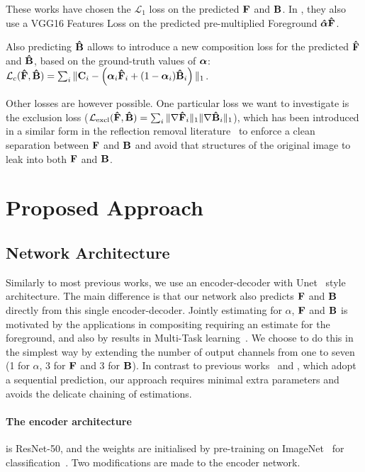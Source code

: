 \documentclass[runningheads]{llncs}
\begin{document}
These works have chosen the $\mathcal{L}_1$ loss on the predicted $\mathbf{{{F}}}$ and $\mathbf{{{B}}}$.  In
\cite{ContextMatting}, they also use a VGG16 Features Loss on the predicted
pre-multiplied Foreground $\bm{\hat{\alpha}} \mathbf{\hat{{F}}}$.

Also predicting $\mathbf{\hat{{B}}}$ allows \cite{LearningBasedSamplingMatting} to introduce a new composition loss for the predicted $\mathbf{\hat{{F}}}$ and $\mathbf{\hat{{B}}}$, based on the
ground-truth values of $\bm{{\alpha}}$: $\mathcal{L}_{c}(\mathbf{\hat{{F}}},\mathbf{\hat{{B}}}) = \sum_i \|\mathbf{C}_i -  \left(\bm{{\alpha}}_i \mathbf{\hat{{F}}}_i +
(1-\bm{{\alpha}}_i) \mathbf{\hat{{B}}}_i\right) \|_1$.


Other losses are however possible. One particular loss we want to investigate is
the exclusion loss ($\mathcal{L}_{\mathrm{excl}}(\mathbf{\hat{{F}}},\mathbf{\hat{{B}}}) = \sum_i \|  \nabla \mathbf{\hat{{F}}}_i \|_1  \| \nabla \mathbf{\hat{{B}}}_i \|_1$), which has been introduced in a similar form in the reflection removal literature~\cite{perceptualReflectionRemoval}
to enforce a clean separation between $\mathbf{{{F}}}$ and $\mathbf{{{B}}}$ and avoid that structures of
the original image to leak into both $\mathbf{{{F}}}$ and $\mathbf{{{B}}}$.



\section{Proposed Approach}\label{sec:method}




\subsection{Network Architecture}

Similarly to most previous works, we use an encoder-decoder with
Unet~\cite{unet} style architecture. The main difference is that our network
also predicts $\mathbf{{{F}}}$ and $\mathbf{{{B}}}$ directly from this single encoder-decoder. Jointly
estimating for $\alpha$, $\mathbf{{{F}}}$ and $\mathbf{{{B}}}$ is motivated by the applications in
compositing requiring an estimate for the foreground, and also by results in
Multi-Task learning~\cite{ruder2017overview}. We choose to do this in the simplest way by
extending the number of output channels from one to seven (1 for $\alpha$, 3 for
$\mathbf{{{F}}}$ and 3 for $\mathbf{{{B}}}$). In contrast to previous works~\cite{ContextMatting} and
\cite{LearningBasedSamplingMatting}, which adopt a sequential prediction, our
approach requires minimal extra parameters and avoids the delicate chaining of
estimations.


\paragraph{The encoder architecture} is ResNet-50, and the weights are
initialised by pre-training on ImageNet~\cite{imagenet} for
classification~\cite{weightstandardization}. Two modifications are made to the
encoder network.
\end{document}
